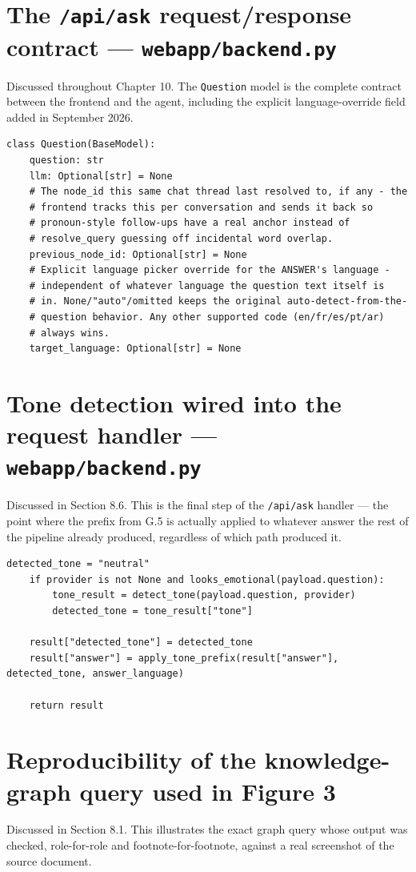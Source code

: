 \section{The \texttt{/\allowbreak{}api/\allowbreak{}ask} request/response contract — \texttt{webapp/\allowbreak{}backend.py}}
Discussed throughout Chapter 10. The \texttt{Question} model is the complete contract between the frontend and the agent, including the explicit language-override field added in September 2026.

\begin{lstlisting}[caption={webapp/backend.py — the Question model}]
class Question(BaseModel):
    question: str
    llm: Optional[str] = None
    # The node_id this same chat thread last resolved to, if any - the
    # frontend tracks this per conversation and sends it back so
    # pronoun-style follow-ups have a real anchor instead of
    # resolve_query guessing off incidental word overlap.
    previous_node_id: Optional[str] = None
    # Explicit language picker override for the ANSWER's language -
    # independent of whatever language the question text itself is
    # in. None/"auto"/omitted keeps the original auto-detect-from-the-
    # question behavior. Any other supported code (en/fr/es/pt/ar)
    # always wins.
    target_language: Optional[str] = None
\end{lstlisting}
\section{Tone detection wired into the request handler — \texttt{webapp/\allowbreak{}backend.py}}
Discussed in Section 8.6. This is the final step of the \texttt{/\allowbreak{}api/\allowbreak{}ask} handler — the point where the prefix from G.5 is actually applied to whatever answer the rest of the pipeline already produced, regardless of which path produced it.

\begin{lstlisting}[caption={webapp/backend.py — end of ask(), tone detection}]
    detected_tone = "neutral"
    if provider is not None and looks_emotional(payload.question):
        tone_result = detect_tone(payload.question, provider)
        detected_tone = tone_result["tone"]

    result["detected_tone"] = detected_tone
    result["answer"] = apply_tone_prefix(result["answer"], detected_tone, answer_language)

    return result
\end{lstlisting}
\section{Reproducibility of the knowledge-graph query used in Figure 3}
Discussed in Section 8.1. This illustrates the exact graph query whose output was checked, role-for-role and footnote-for-footnote, against a real screenshot of the source document.

